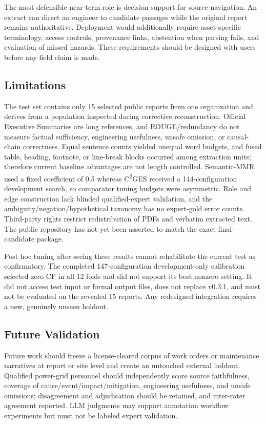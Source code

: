 \documentclass[applsci,article,submit,moreauthors]{Definitions/mdpi}
\newcommand{\cges}{C\textsuperscript{2}GES}
\begin{document}
The most defensible near-term role is decision support for source navigation. An extract can direct an engineer to candidate passages while the original report remains authoritative. Deployment would additionally require asset-specific terminology, access controls, provenance links, abstention when parsing fails, and evaluation of missed hazards. These requirements should be designed with users before any field claim is made.

\subsection{Limitations}

The test set contains only 15 selected public reports from one organization and derives from a population inspected during corrective reconstruction. Official Executive Summaries are long references, and ROUGE/redundancy do not measure factual sufficiency, engineering usefulness, unsafe omission, or causal-chain correctness. Equal sentence counts yielded unequal word budgets, and fused table, heading, footnote, or line-break blocks occurred among extraction units; therefore current baseline advantages are not length controlled. Semantic-MMR used a fixed coefficient of 0.5 whereas \cges{} received a 144-configuration development search, so comparator tuning budgets were asymmetric. Role and edge construction lack blinded qualified-expert validation, and the ambiguity/negation/hypothetical taxonomy has no expert-gold error counts. Third-party rights restrict redistribution of PDFs and verbatim extracted text. The public repository has not yet been asserted to match the exact final-candidate package.

Post hoc tuning after seeing these results cannot rehabilitate the current test as confirmatory. The completed 147-configuration development-only calibration selected zero CF in all 12 folds and did not support its best nonzero setting. It did not access test input or formal output files, does not replace v0.3.1, and must not be evaluated on the revealed 15 reports. Any redesigned integration requires a new, genuinely unseen holdout.

\subsection{Future Validation}

Future work should freeze a license-cleared corpus of work orders or maintenance narratives at report or site level and create an untouched external holdout. Qualified power-grid personnel should independently score source faithfulness, coverage of cause/event/impact/mitigation, engineering usefulness, and unsafe omissions; disagreement and adjudication should be retained, and inter-rater agreement reported. LLM judgments may support annotation workflow experiments but must not be labeled expert validation.
\end{document}
